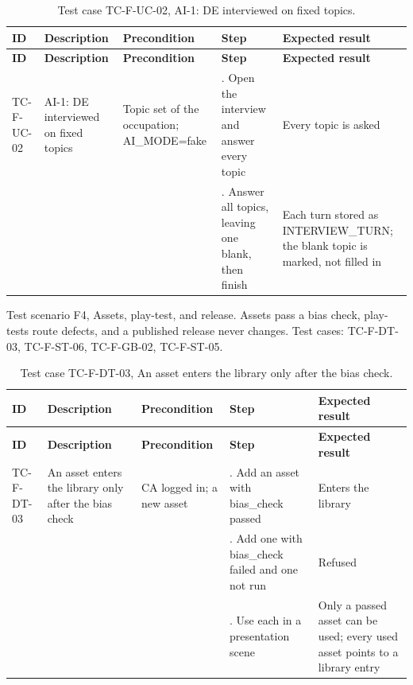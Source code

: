 {\small
\begin{longtable}{|>{\raggedright\arraybackslash}p{}|>{\raggedright\arraybackslash}p{}|>{\raggedright\arraybackslash}p{}|>{\raggedright\arraybackslash}p{}|>{\raggedright\arraybackslash}p{}|}
\caption{Test case TC-F-UC-02, AI-1: DE interviewed on fixed topics.} \\
\hline
\textbf{ID} & \textbf{Description} & \textbf{Precondition} & \textbf{Step} & \textbf{Expected result} \\ \hline
\endfirsthead
\hline
\textbf{ID} & \textbf{Description} & \textbf{Precondition} & \textbf{Step} & \textbf{Expected result} \\ \hline
\endhead
TC-F-UC-02 & AI-1: DE interviewed on fixed topics & Topic set of the occupation; AI\_MODE=fake & 1. Open the interview and answer every topic & Every topic is asked \\ \hline
 &  &  & 2. Answer all topics, leaving one blank, then finish & Each turn stored as INTERVIEW\_TURN; the blank topic is marked, not filled in \\ \hline
\end{longtable}
}

Test scenario F4, Assets, play-test, and release. Assets pass a bias check, play-tests route defects, and a published release never changes. Test cases: TC-F-DT-03, TC-F-ST-06, TC-F-GB-02, TC-F-ST-05.

{\small
\begin{longtable}{|>{\raggedright\arraybackslash}p{}|>{\raggedright\arraybackslash}p{}|>{\raggedright\arraybackslash}p{}|>{\raggedright\arraybackslash}p{}|>{\raggedright\arraybackslash}p{}|}
\caption{Test case TC-F-DT-03, An asset enters the library only after the bias check.} \\
\hline
\textbf{ID} & \textbf{Description} & \textbf{Precondition} & \textbf{Step} & \textbf{Expected result} \\ \hline
\endfirsthead
\hline
\textbf{ID} & \textbf{Description} & \textbf{Precondition} & \textbf{Step} & \textbf{Expected result} \\ \hline
\endhead
TC-F-DT-03 & An asset enters the library only after the bias check & CA logged in; a new asset & 1. Add an asset with bias\_check passed & Enters the library \\ \hline
 &  &  & 2. Add one with bias\_check failed and one not run & Refused \\ \hline
 &  &  & 3. Use each in a presentation scene & Only a passed asset can be used; every used asset points to a library entry \\ \hline
\end{longtable}
}

